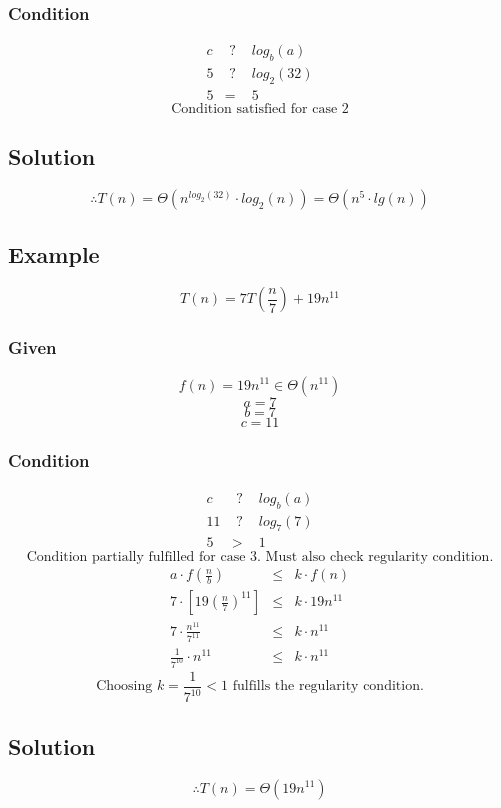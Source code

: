 \subsubsection*{Condition}
\begin{eqnarray*}
	c &\text{ ? }& log_b(a)\\
	5 &\text{ ? }& log_2(32)\\
	5 &=& 5
\end{eqnarray*}
$$\text{Condition satisfied for case 2}$$

\subsection*{Solution}
$$
\therefore T(n) = \Theta(n^{log_2(32)} \cdot log_2(n)) = \Theta(n^5 \cdot lg(n))
$$

\subsection{Example}
$$
T(n) = 7T(\frac{n}{7}) + 19n^{11}
$$

\subsubsection*{Given}
$$f(n) = 19n^{11} \in \Theta(n^{11})$$
$$a = 7$$
$$b = 7$$
$$c = 11$$

\subsubsection*{Condition}
\begin{eqnarray*}
	c &\text{ ? }& log_b(a)\\
	11 &\text{ ? }& log_7(7)\\
	5 &>& 1
\end{eqnarray*}
$$\text{Condition partially fulfilled for case 3. Must also check regularity condition.}$$
\begin{eqnarray*}
	a \cdot f(\frac{n}{b}) &\leq& k \cdot f(n)\\
	7 \cdot \left[ 19(\frac{n}{7})^{11} \right] &\leq& k \cdot 19n^{11}\\
	7 \cdot \frac{n^{11}}{7^{11}} &\leq& k \cdot n^{11}\\
	\frac{1}{7^{10}} \cdot n^{11} &\leq& k \cdot n^{11}
\end{eqnarray*}
$$\text{Choosing } k = \frac{1}{7^{10}} < 1 \text{ fulfills the regularity condition.}$$

\subsection*{Solution}
$$
\therefore T(n) = \Theta(19n^{11})
$$
